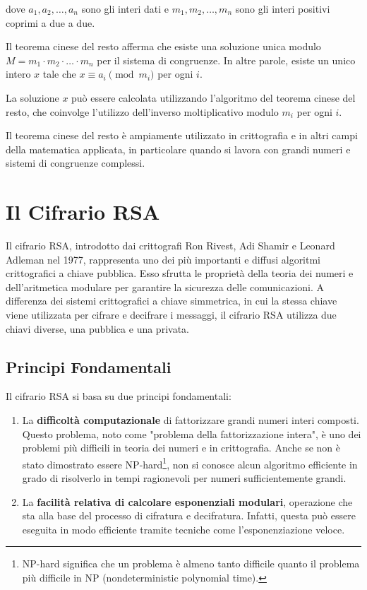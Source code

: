 \documentclass[a4paper,12pt]{report}
\begin{document}
dove $a_1, a_2, \ldots, a_n$ sono gli interi dati e $m_1, m_2, \ldots, m_n$ sono gli interi positivi coprimi a due a due.

Il teorema cinese del resto afferma che esiste una soluzione unica modulo $M = m_1 \cdot m_2 \cdot \ldots \cdot m_n$ per il sistema di congruenze. In altre parole, esiste un unico intero $x$ tale che $x \equiv a_i \pmod{m_i}$ per ogni $i$.

La soluzione $x$ può essere calcolata utilizzando l'algoritmo del teorema cinese del resto, che coinvolge l'utilizzo dell'inverso moltiplicativo modulo $m_i$ per ogni $i$.

Il teorema cinese del resto è ampiamente utilizzato in crittografia e in altri campi della matematica applicata, in particolare quando si lavora con grandi numeri e sistemi di congruenze complessi.
%
%
%
%
%
%
%
%
%
%
%
%
%
%
%
%
%
%
%
%
%
%
%
%
%
%
%
%
%
%
%
%
%
%
%
%
%
%
%
%
%
\chapter{Il Cifrario RSA}
Il cifrario RSA, introdotto dai crittografi Ron Rivest, Adi Shamir e Leonard Adleman nel 1977, rappresenta uno dei più importanti e diffusi algoritmi crittografici a chiave pubblica. 
Esso sfrutta le proprietà della teoria dei numeri e dell'aritmetica modulare per garantire la sicurezza delle comunicazioni. 
A differenza dei sistemi crittografici a chiave simmetrica, in cui la stessa chiave viene utilizzata per cifrare e decifrare i messaggi, il cifrario RSA utilizza due chiavi diverse, una pubblica e una privata.

\section{Principi Fondamentali}
Il cifrario RSA si basa su due principi fondamentali:

\begin{enumerate}
    \item La \textbf{difficoltà computazionale} di fattorizzare grandi numeri interi composti. Questo problema, noto come "problema della fattorizzazione intera", è uno dei problemi più difficili in teoria dei numeri e in crittografia. Anche se non è stato dimostrato essere NP-hard\footnote[1]{NP-hard significa che un problema è almeno tanto difficile quanto il problema più difficile in NP (nondeterministic polynomial time).}, non si conosce alcun algoritmo efficiente in grado di risolverlo in tempi ragionevoli per numeri sufficientemente grandi.
    \item La \textbf{facilità relativa di calcolare esponenziali modulari}, operazione che sta alla base del processo di cifratura e decifratura. Infatti, questa può essere eseguita in modo efficiente tramite tecniche come l'esponenziazione veloce.
\end{enumerate}
\end{document}
